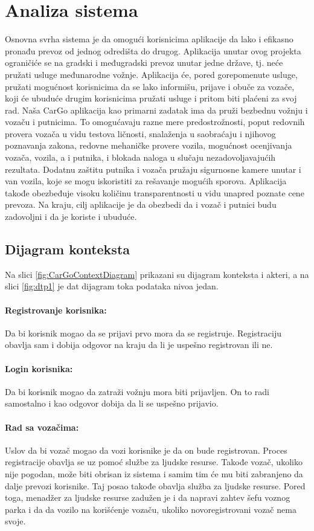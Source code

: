 \section{\bfseries Analiza sistema}

Osnovna svrha sistema je da omogući korisnicima aplikacije da lako i efikasno pronađu prevoz od jednog odredišta do drugog. Aplikacija unutar ovog projekta ograničiće se na gradski i međugradski prevoz unutar jedne države, tj. neće pružati usluge međunarodne vožnje. Aplikacija će, pored gorepomenute usluge, pružati mogućnost korisnicima da se lako informišu, prijave i obuče za vozače, koji će ubuduće drugim korisnicima pružati usluge i pritom biti plaćeni za svoj rad. Naša CarGo aplikacija kao primarni zadatak ima da pruži bezbednu vožnju i vozaču i putnicima. To omogućavaju razne mere predostrožnosti, poput redovnih provera vozača u vidu testova ličnosti, snalaženja u saobraćaju i njihovog poznavanja zakona, redovne mehaničke provere vozila, mogućnost ocenjivanja vozača, vozila, a i putnika, i blokada naloga u slučaju nezadovoljavajućih rezultata. Dodatnu zaštitu putnika i vozača pružaju sigurnosne kamere unutar i van vozila, koje se mogu iskoristiti za rešavanje mogućih sporova. Aplikacija takođe obezbeđuje visoku količinu transparentnosti u vidu unapred poznate cene prevoza. Na kraju, cilj aplikacije je da obezbedi da i vozač i putnici budu zadovoljni i da je koriste i ubuduće.

\subsection{\bfseries Dijagram konteksta}

\quad Na slici \ref{fig:CarGoContextDiagram} prikazani su dijagram konteksta i akteri, a na slici \ref{fig:dtp1} je dat dijagram toka podataka nivoa jedan.
\paragraph{Registrovanje korisnika:}
    Da bi korisnik mogao da se prijavi prvo mora da se registruje. Registraciju obavlja sam i dobija odgovor na kraju da li je uspešno registrovan ili ne.
\paragraph{Login korisnika:}
    Da bi korisnik mogao da zatraži vožnju mora biti prijavljen. On to radi samostalno i kao odgovor dobija da li se uspešno prijavio.
\paragraph{Rad sa vozačima:}
    Uslov da bi vozač mogao da vozi korisnike je da on bude registrovan. Proces registracije obavlja se uz pomoć službe za ljudske resurse. Takođe vozač, ukoliko nije pogodan, može biti obrisan iz sistema i samim tim će mu biti zabranjeno da dalje prevozi korisnike. Taj posao takođe obavlja služba za ljudske resurse. Pored toga, menadžer za ljudske resurse zadužen je i da napravi zahtev šefu voznog parka i da da vozilo na korišćenje vozaču, ukoliko novoregistrovani vozač nema svoje.
